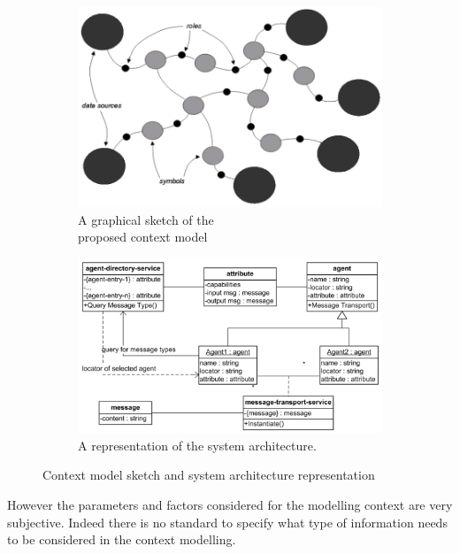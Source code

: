 \documentclass{thesisreport}
\begin{document}
 
 \begin{figure}[h]
    \centering
    \begin{subfigure}{0.47\textwidth}
        \includegraphics[width=\textwidth]{Thesis/data/ContextModelSketchh.png}
        \caption{A graphical sketch of the\\ proposed context model}
        \label{fig:sketch}
    \end{subfigure}
    \begin{subfigure}{0.47\textwidth}
        \includegraphics[width=\textwidth]{Thesis/data/architecture.png}
        \caption{A representation of the system architecture.}
        \label{fig:architecture}
    \end{subfigure}
    \caption{Context model sketch and system architecture representation}
    \label{fig:architecture-sketch}
 \end{figure}

 
 However the parameters and factors considered for the modelling context are very subjective. Indeed there is no standard to specify what type of information needs to be considered in the context modelling.
 
\end{document}
